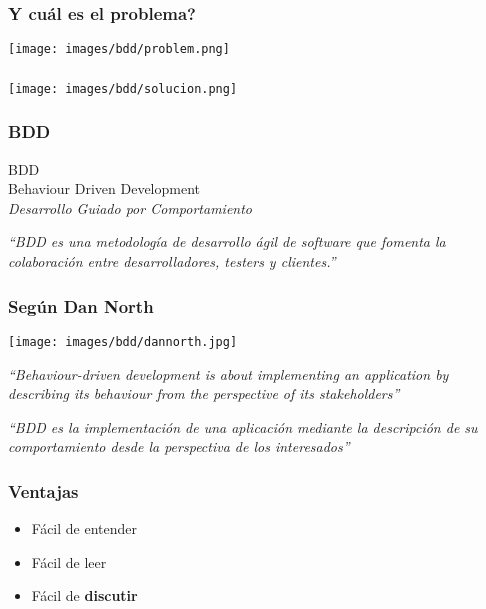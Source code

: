 \documentclass{beamer}
\begin{document}
\begin{frame}
  \frametitle{Y cu\'al es el problema?}
  \begin{center}
    \texttt{[image: images/bdd/problem.png]}
  \end{center}
\end{frame}

\begin{frame}
  \frametitle{}
  \begin{center}
    \texttt{[image: images/bdd/solucion.png]}
  \end{center}
\end{frame}

\begin{frame}
  \frametitle{BDD}
  \begin{center}
    {\huge BDD} \\
    Behaviour Driven Development \\
    \vspace{1cm}
    {\it Desarrollo Guiado por Comportamiento}

    {\it ``BDD es una metodología de desarrollo ágil de software que fomenta la colaboración
    entre desarrolladores, testers y clientes.''}
  \end{center}
\end{frame}

\begin{frame}
\frametitle{Seg\'un Dan North}
  \texttt{[image: images/bdd/dannorth.jpg]}
  \begin{center}
    \vspace{0.5cm}
    {\it ``Behaviour-driven development is about implementing an application by describing
    its behaviour from the perspective of its stakeholders''}

    \vspace{0.5cm}

    {\it ``BDD es la implementación de una aplicación mediante la descripción de su comportamiento
      desde la perspectiva de los interesados''}
  \end{center}
\end{frame}

\begin{frame}
  \frametitle{Ventajas}
  \begin{itemize}
    \item Fácil de entender
    \item Fácil de leer
    \item Fácil de {\bfseries discutir}
  \end{itemize}
\end{frame}
\end{document}
